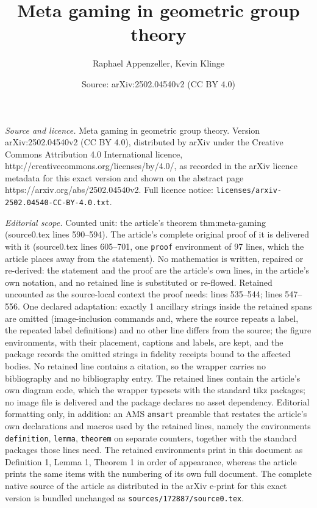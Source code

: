 \documentclass[10pt,a4paper]{amsart}
\title{Meta gaming in geometric group theory}
\author{Raphael Appenzeller, Kevin Klinge}
\date{Source: arXiv:2502.04540v2 (CC BY 4.0)}
\begin{document}
\maketitle

\noindent\emph{Source and licence.} Meta gaming in geometric group theory. Version arXiv:2502.04540v2 (CC BY 4.0), distributed by arXiv under the Creative Commons Attribution 4.0 International licence, http://creativecommons.org/licenses/by/4.0/, as recorded in the arXiv licence metadata for this exact version and shown on the abstract page https://arxiv.org/abs/2502.04540v2. Full licence notice: \texttt{licenses/arxiv-2502.04540-CC-BY-4.0.txt}.\par\smallskip

\noindent\textit{Editorial scope.} Counted unit: the article's theorem thm:meta-gaming (source0.tex lines 590--594). The article's complete original proof of it is delivered with it (source0.tex lines 605--701, one \texttt{proof} environment of 97 lines, which the article places away from the statement). No mathematics is written, repaired or re-derived: the statement and the proof are the article's own lines, in the article's own notation, and no retained line is substituted or re-flowed.  Retained uncounted as the source-local context the proof needs: lines 535--544; lines 547--556.  One declared adaptation: exactly 1 ancillary strings inside the retained spans are omitted (image-inclusion commands and, where the source repeats a label, the repeated label definitions) and no other line differs from the source; the figure environments, with their placement, captions and labels, are kept, and the package records the omitted strings in fidelity receipts bound to the affected bodies.  No retained line contains a citation, so the wrapper carries no bibliography and no bibliography entry.  The retained lines contain the article's own diagram code, which the wrapper typesets with the standard tikz packages; no image file is delivered and the package declares no asset dependency.  Editorial formatting only, in addition: an AMS \texttt{amsart} preamble that restates the article's own declarations and macros used by the retained lines, namely the environments \texttt{definition}, \texttt{lemma}, \texttt{theorem} on separate counters, together with the standard packages those lines need.  The retained environments print in this document as Definition 1, Lemma 1, Theorem 1 in order of appearance, whereas the article prints the same items with the numbering of its own full document.  The complete native source of the article as distributed in the arXiv e-print for this exact version is bundled unchanged as \texttt{sources/172887/source0.tex}.
\end{document}

